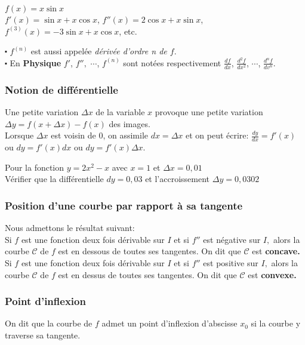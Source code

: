   \begin{example}
 $ f(x)= x\sin x $ \\
 $ f'(x)=\sin x+x\cos x $, $ f''(x)=2\cos x+x\sin x $, $ f^{(3)}(x)=-3\sin x+x\cos x $, etc.
  \end{example}
   \begin{remark}
 $ \centerdot $ $ f^{(n)}$ est aussi appelée \emph{dérivée d'ordre n de $ f. $} \\
  $ \centerdot $ En \textbf{\color{magenta}Physique} $f' $, $ f'', $ $\cdots$, $ f^{(n)}$ sont notées respectivement $\frac{df}{dx} $, $ \frac{d^{2}f}{dx^{2}} $, $\cdots$, $ \frac{d^{n}f}{dv^{n}}$.
 \end{remark}
\subsubsection*{Notion de différentielle}
Une petite variation $ \Delta x $ de la variable $ x $ provoque une petite variation  $ \Delta y = f(x+ \Delta x)-f(x) $ des images.\\ Lorsque $ \Delta x $ est voisin de $ 0 $, on assimile $ dx=\Delta x $ et on peut écrire: $ \frac{dy}{dx} =f'(x)$ ou $ dy=f'(x)dx $ ou $ dy=f'(x)\Delta x $.
\begin{example}
 Pour la fonction $ y=2x^2-x $ avec $x=1 $  et $\Delta x= 0,01 $ \\ Vérifier que la différentielle $dy=0,03  $ et l'accroissement $ \Delta y= 0,0302 $
\end{example}
\subsubsection*{Position d'une courbe par rapport à sa tangente}
  Nous admettons le résultat suivant:\\ Si $ f $ est une fonction deux fois dérivable sur $ I $ et si $ f'' $ est négative sur $ I, $ alors la courbe $\mathcal{C} $ de $ f$ est en dessous de toutes ses tangentes. On dit  que  $\mathcal{C} $ est \textbf{ concave.}\\
   Si $ f $ est une fonction deux fois dérivable sur $ I $ et si $ f'' $ est positive sur $ I, $ alors la courbe $\mathcal{C} $ de $ f$ est en dessus de toutes ses tangentes. On dit  que  $\mathcal{C} $ est \textbf{ convexe.}
  \subsubsection*{Point d'inflexion}
  \begin{definition}
  On dit que la courbe de $ f $ admet un point d'inflexion d'abscisse $ x_{0} $ si la courbe y traverse sa tangente.
  \end{definition}

